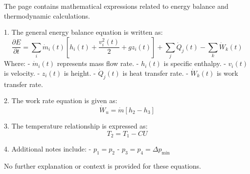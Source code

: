 The page contains mathematical expressions related to energy balance and thermodynamic calculations.  

1. The general energy balance equation is written as:  
\[
\frac{\partial E}{\partial t} = \sum_i \dot{m}_i(t) \left[ h_i(t) + \frac{v_i^2(t)}{2} + g z_i(t) \right] + \sum_j \dot{Q}_j(t) - \sum_k \dot{W}_k(t)
\]  
Where:  
- \( \dot{m}_i(t) \) represents mass flow rate.  
- \( h_i(t) \) is specific enthalpy.  
- \( v_i(t) \) is velocity.  
- \( z_i(t) \) is height.  
- \( \dot{Q}_j(t) \) is heat transfer rate.  
- \( \dot{W}_k(t) \) is work transfer rate.  

2. The work rate equation is given as:  
\[
\dot{W}_u = \dot{m} \left[ h_2 - h_3 \right]
\]  

3. The temperature relationship is expressed as:  
\[
T_2 = T_1 - CU
\]  

4. Additional notes include:  
- \( p_1 = p_2 \)  
- \( p_3 = p_4 = \Delta p_{\text{min}} \)  

No further explanation or context is provided for these equations.
